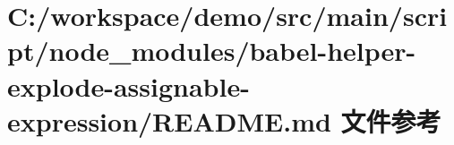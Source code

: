 \hypertarget{node__modules_2babel-helper-explode-assignable-expression_2_r_e_a_d_m_e_8md}{}\section{C\+:/workspace/demo/src/main/script/node\+\_\+modules/babel-\/helper-\/explode-\/assignable-\/expression/\+R\+E\+A\+D\+ME.md 文件参考}
\label{node__modules_2babel-helper-explode-assignable-expression_2_r_e_a_d_m_e_8md}
